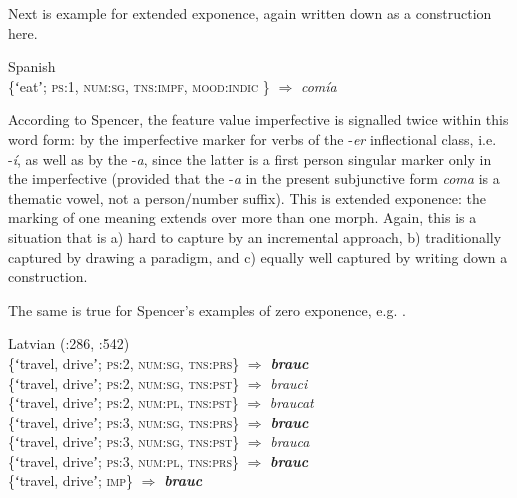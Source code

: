 \documentclass[output=paper]{langsci/langscibook}
\begin{document}
Next is  example for extended exponence, again written down as a construction here.

\ea \label{ex:reiner:5} 
{Spanish \citep[286]{Spencer2001}}\\ 
\glt \{ʻeatʼ; \textsc{ps}:1, \textsc{num}:\textsc{sg}, \textsc{tns}:\textsc{impf}, \textsc{mood}:\textsc{indic} \} ${\Rightarrow}$ \textit{comía}
\z

According to Spencer, the feature value imperfective is signalled twice within this word form: by the imperfective marker for verbs of the \nobreakdash-\textit{er} inflectional class, i.e. -\textit{í}, as well as by the \nobreakdash-\textit{a}, since the latter is a first person singular marker only in the imperfective (provided that the \nobreakdash-\textit{a} in the present subjunctive form \textit{coma} is a thematic vowel, not a person\slash number suffix). This is extended exponence: the marking of one meaning extends over more than one morph. Again, this is a situation that is a) hard to capture by an incremental approach, b) traditionally captured by drawing a paradigm, and c) equally well captured by writing down a construction.

The same is true for Spencer’s examples of zero exponence, e.g. .

\ea \label{ex:reiner:6} 
{Latvian (\citealt{Spencer2001}:286, \citealt{FennellGelsen1980}:542)}\\ \ea
\label{ex:reiner:6a}
   \textup{\{ʻtravel, driveʼ;} \textsc{ps}\textup{:2,} \textsc{num}\textup{:}\textsc{sg}, \textsc{tns}\textup{:}\textsc{prs}\textup{\} ${\Rightarrow}$} \textit{\textbf{brauc}}\\
\ex \label{ex:reiner:6b} \textup{\{ʻtravel, driveʼ;} \textsc{ps}\textup{:2,} \textsc{num}\textup{:}\textsc{sg}, \textsc{tns}\textup{:}\textsc{pst}\textup{\} ${\Rightarrow}$} \textit{brauci}\\
\ex \label{ex:reiner:6c} \{ʻtravel, driveʼ; \textsc{ps}:2, \textsc{num}:\textsc{pl}, \textsc{tns}:\textsc{pst}\} ${\Rightarrow}$ \textit{braucat}\\
\ex \label{ex:reiner:6d}  \textup{\{ʻtravel, driveʼ;} \textsc{ps}\textup{:3,} \textsc{num}\textup{:}\textsc{sg}, \textsc{tns}\textup{:}\textsc{prs}\textup{\} ${\Rightarrow}$} \textit{\textbf{brauc}}\\
\ex \label{ex:reiner:6e} \{ʻtravel, driveʼ; \textsc{ps}:3, \textsc{num}:\textsc{sg}, \textsc{tns}:\textsc{pst}\} ${\Rightarrow}$ \textit{brauca}\\
\ex \label{ex:reiner:6f}  \textup{\{ʻtravel, driveʼ;} \textsc{ps}\textup{:3,} \textsc{num}\textup{:}\textsc{pl}, \textsc{tns}\textup{:}\textsc{prs}\textup{\} ${\Rightarrow}$} \textit{\textbf{brauc}}\\
\ex \label{ex:reiner:6g} \{ʻtravel, driveʼ; \textsc{imp}\} ${\Rightarrow}$ \textbf{\textit{brauc}}\\
\z\z
\end{document}
